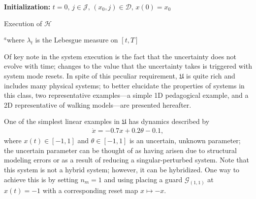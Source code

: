 \par
\begin{algorithm}[!t]
\small
 {\bf Initialization:} $t=0,\,j\in \mathcal J,\,(x_0,j)\in \mathcal D,\,x(0)=x_0$\;
 \While{1}{
 {\em Let} $\theta$ be drawn according to $\mu_{\theta_j}$\;
 {\em Let} $\gamma\colon [t,T]\rightarrow \mathrm{M}_j$, abs. ct. st.\\\hspace{.2in}
 $\dot \gamma(s)=\tilde f(\gamma(s),\theta)$ $\lambda_t^{\text{\tiny a}}$-a.e., $s\in [t,T]$\\\hspace{.2in}
 $\gamma(t)=x(t)$\;
 $\Lambda_{(j,t)}:=\{r\in [t,T]| \exists (j,k)\in \mathcal E \text{ st. } (\gamma(r),\theta)\in \mathcal G_{(j,k)}\}$\;
 \eIf {$\Lambda_{(j,t)}\ne \emptyset$}{%
    $t':=\min \Lambda_{(j,t)}$, $k$ st. $\gamma(t')\in \pi_{x}\mathcal G_{(j,k)}$\\\hspace{.2in}
     $x(s)\leftarrow \gamma(s)$, $\forall s\in [t,t')$\\ \hspace{.2in}
    $t\leftarrow t',\,x(t')\leftarrow R_{(j,k)}(\gamma(t')),\,j\leftarrow k$
 }
 {
 $x(s)=\gamma(s),\,\forall s\in [t,T]$\;
 Stop\;
 }
 }
 \caption{Execution of $\mathcal H$}
 \label{alg:execution}
 $^a$where $\lambda_t$ is the Lebesgue measure on $[t,T]$
\end{algorithm}
Of key note in the system execution is the fact that the uncertainty does not evolve with time; changes to the value that the uncertainty takes is triggered with system mode resets. In spite of this peculiar requirement, $\mathfrak{U}$ is quite rich and includes many physical systems; to better elucidate the properties of systems in this class, two representative examples---a simple 1D pedagogical example, and a 2D representative of walking models---are presented hereafter.
\begin{example}
\label{example:1D}
One of the simplest linear examples in $\mathfrak{U}$ has dynamics described by
\begin{align}
	\dot x = -0.7x+0.2\theta-0.1,
\end{align}
where \mbox{$x(t)\in [-1,1]$} and $\theta\in [-1,1]$ is an uncertain, unknown parameter; the uncertain parameter can be thought of as having arisen due to structural modeling errors or as a result of reducing a singular-perturbed system. Note that this system is not a hybrid system; however, it can be hybridized. One way to achieve this is by setting $n_m=1$ and using placing a guard $\mathcal G_{(1,1)}$ at $x(t)=-1$ with a corresponding reset map $x\mapsto -x$.
\end{example}

